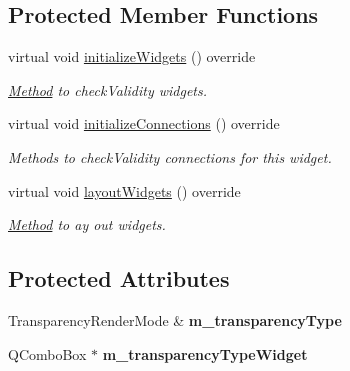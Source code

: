 \subsection*{Protected Member Functions}
\begin{DoxyCompactItemize}
\item 
\mbox{\label{classrev_1_1_view_1_1_transparency_type_widget_a803c09bc54afb97e35f58379d1b0d681}} 
virtual void \mbox{\hyperlink{classrev_1_1_view_1_1_transparency_type_widget_a803c09bc54afb97e35f58379d1b0d681}{initialize\+Widgets}} () override
\begin{DoxyCompactList}\small\item\em \mbox{\hyperlink{struct_method}{Method}} to check\+Validity widgets. \end{DoxyCompactList}\item 
\mbox{\label{classrev_1_1_view_1_1_transparency_type_widget_a2b752970050cb4a13a6774816cbb8f90}} 
virtual void \mbox{\hyperlink{classrev_1_1_view_1_1_transparency_type_widget_a2b752970050cb4a13a6774816cbb8f90}{initialize\+Connections}} () override
\begin{DoxyCompactList}\small\item\em Methods to check\+Validity connections for this widget. \end{DoxyCompactList}\item 
\mbox{\label{classrev_1_1_view_1_1_transparency_type_widget_a25b0987a91842d8a3af7ab9b1a62d699}} 
virtual void \mbox{\hyperlink{classrev_1_1_view_1_1_transparency_type_widget_a25b0987a91842d8a3af7ab9b1a62d699}{layout\+Widgets}} () override
\begin{DoxyCompactList}\small\item\em \mbox{\hyperlink{struct_method}{Method}} to ay out widgets. \end{DoxyCompactList}\end{DoxyCompactItemize}
\subsection*{Protected Attributes}
\begin{DoxyCompactItemize}
\item 
\mbox{\label{classrev_1_1_view_1_1_transparency_type_widget_a02284b80018da1ffb829546137290c10}} 
Transparency\+Render\+Mode \& {\bfseries m\+\_\+transparency\+Type}
\item 
\mbox{\label{classrev_1_1_view_1_1_transparency_type_widget_af23f10c6719d59d4c17553d36ab90248}} 
Q\+Combo\+Box $\ast$ {\bfseries m\+\_\+transparency\+Type\+Widget}
\end{DoxyCompactItemize}
